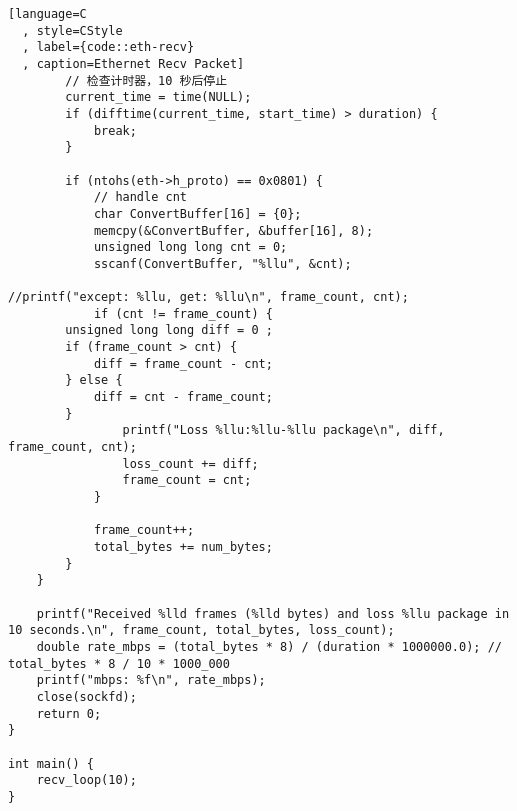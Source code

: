 \begin{lstlisting}[language=C
  , style=CStyle
  , label={code::eth-recv}
  , caption=Ethernet Recv Packet]
        // 检查计时器，10 秒后停止
        current_time = time(NULL);
        if (difftime(current_time, start_time) > duration) {
            break;
        }

        if (ntohs(eth->h_proto) == 0x0801) {
            // handle cnt
            char ConvertBuffer[16] = {0};
            memcpy(&ConvertBuffer, &buffer[16], 8);
            unsigned long long cnt = 0;
            sscanf(ConvertBuffer, "%llu", &cnt);

//printf("except: %llu, get: %llu\n", frame_count, cnt);
            if (cnt != frame_count) {
		unsigned long long diff = 0 ;
		if (frame_count > cnt) {
			diff = frame_count - cnt;
		} else {
			diff = cnt - frame_count;
		}
                printf("Loss %llu:%llu-%llu package\n", diff, frame_count, cnt);
                loss_count += diff;
                frame_count = cnt;
            }

            frame_count++;
            total_bytes += num_bytes;
        }
    }

    printf("Received %lld frames (%lld bytes) and loss %llu package in 10 seconds.\n", frame_count, total_bytes, loss_count);
    double rate_mbps = (total_bytes * 8) / (duration * 1000000.0); // total_bytes * 8 / 10 * 1000_000
    printf("mbps: %f\n", rate_mbps);
    close(sockfd);
    return 0;
}

int main() {
    recv_loop(10);
}
\end{lstlisting}